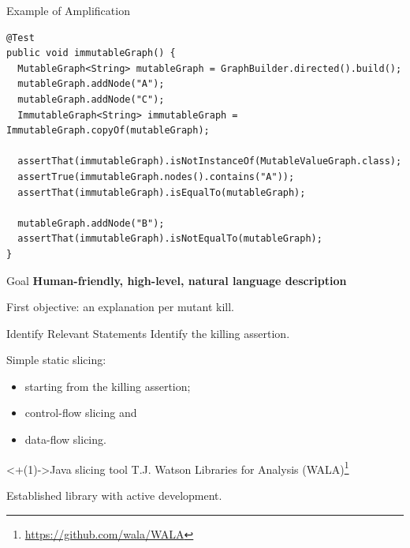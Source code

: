 \documentclass[aspectratio=169]{beamer}
\begin{document}
\begin{frame}[fragile]{Example of Amplification}
  \begin{verbatim}
@Test
public void immutableGraph() {
  MutableGraph<String> mutableGraph = GraphBuilder.directed().build();
  mutableGraph.addNode("A");
  mutableGraph.addNode("C");
  ImmutableGraph<String> immutableGraph = ImmutableGraph.copyOf(mutableGraph);

  assertThat(immutableGraph).isNotInstanceOf(MutableValueGraph.class);
  assertTrue(immutableGraph.nodes().contains("A"));
  assertThat(immutableGraph).isEqualTo(mutableGraph);

  mutableGraph.addNode("B");
  assertThat(immutableGraph).isNotEqualTo(mutableGraph);
}
  \end{verbatim}
\end{frame}

\begin{frame}{Goal}
  \large{\textbf{\textrightarrow{} Human-friendly, high-level, natural language description}}
  \pause{}

  First objective: an explanation per mutant kill.
\end{frame}

\begin{frame}{Identify Relevant Statements}
  Identify the killing assertion.
  \pause{}
  \begin{block}{Simple static slicing:}
    \begin{itemize}
      \item starting from the killing assertion;
      \item control-flow slicing and
      \item data-flow slicing.
    \end{itemize}
  \end{block}
  \vfill{}
  \begin{block}<+(1)->{Java slicing tool}
    T.J. Watson Libraries for Analysis (WALA)\footnote<+->{\url{https://github.com/wala/WALA}} %

    Established library with active development.
  \end{block}
\end{frame}
\end{document}

